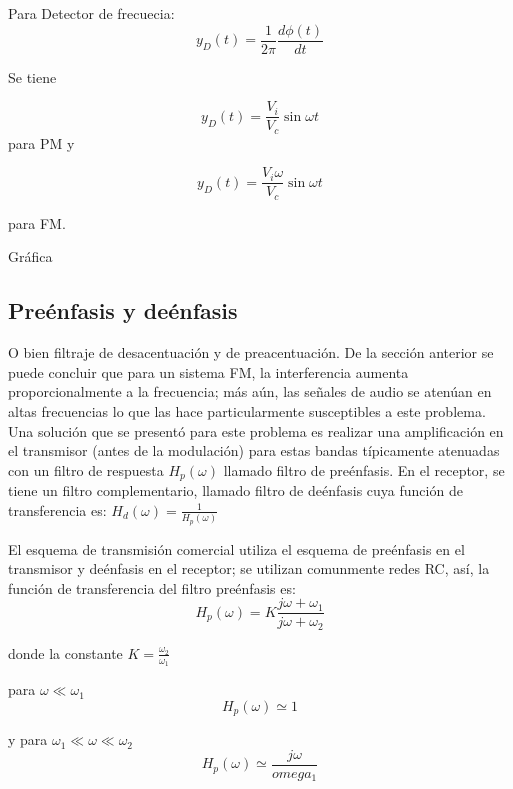 \documentclass[12pt,letterpaper,titlepage,twoside]{book}
\begin{document}
Para Detector de frecuecia: $$y_D(t)=\frac{1}{2\pi} \frac{d \phi(t) }{dt}$$

Se tiene

\begin{equation}
y_D(t) = \frac{V_i}{V_c} \sin \omega t
\end{equation} para PM y

\begin{equation}
y_D(t) = \frac{V_i \omega}{V_c} \sin \omega t
\end{equation}

para FM.

Gráfica






 
\subsection{Preénfasis y deénfasis}

O bien filtraje de desacentuación y de preacentuación. De la sección anterior se puede concluir que para un sistema FM, la interferencia aumenta proporcionalmente a la frecuencia; más aún, las señales de audio se atenúan en altas frecuencias lo que las hace particularmente susceptibles a este problema. Una solución que se presentó para este problema es realizar una amplificación en el transmisor (antes de la modulación) para estas bandas típicamente atenuadas con un filtro de respuesta $H_p(\omega)$ llamado filtro de preénfasis. En el receptor, se tiene un filtro complementario, llamado filtro de deénfasis cuya función de transferencia es: $H_d(\omega) = \frac{1}{H_p(\omega )}$

El esquema de transmisión comercial utiliza el esquema de preénfasis en el transmisor y deénfasis en el receptor; se utilizan comunmente redes RC, así, la función de transferencia del filtro preénfasis es:
\begin{equation}
H_p(\omega)  = K \frac{j \omega + \omega_1}{j \omega + \omega_2}
\end{equation}

donde la constante $K = \frac{\omega_2}{\omega_1}$

para $\omega \ll \omega_1$
\begin{equation}
H_p(\omega)  \simeq 1
\end{equation}

y para $\omega_1 \ll \omega \ll \omega_2$
\begin{equation}
H_p(\omega)  \simeq \frac{j\omega}{omega_1}
\end{equation}
\end{document}
